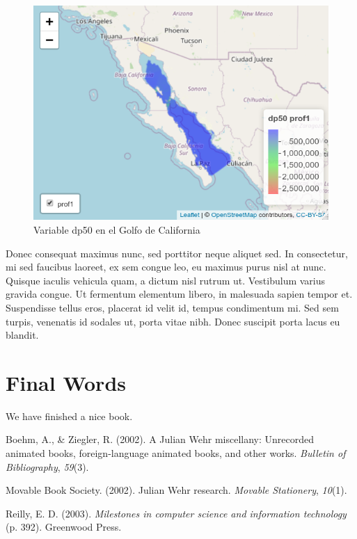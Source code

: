 \documentclass[
]{article}
\newlength{\cslhangindent}
\newenvironment{cslreferences}%
  {\setlength{\parindent}{0pt}%
  \everypar{\setlength{\hangindent}{\cslhangindent}}\ignorespaces}%
  {\par}
\begin{document}
\begin{figure}
\includegraphics[width=0.95\linewidth]{images/golfocalif02} \caption{Variable dp50 en el Golfo de California}\label{fig:Mapa06}
\end{figure}

Donec consequat maximus nunc, sed porttitor neque aliquet sed. In consectetur, mi sed faucibus laoreet, ex sem congue leo, eu maximus purus nisl at nunc. Quisque iaculis vehicula quam, a dictum nisl rutrum ut. Vestibulum varius gravida congue. Ut fermentum elementum libero, in malesuada sapien tempor et. Suspendisse tellus eros, placerat id velit id, tempus condimentum mi. Sed sem turpis, venenatis id sodales ut, porta vitae nibh. Donec suscipit porta lacus eu blandit.

\hypertarget{final-words}{%
\section{Final Words}\label{final-words}}

We have finished a nice book.

\hypertarget{refs}{}
\begin{cslreferences}
\leavevmode\hypertarget{ref-Bohem2002}{}%
Boehm, A., \& Ziegler, R. (2002). A Julian Wehr miscellany: Unrecorded animated books, foreign-language animated books, and other works. \emph{Bulletin of Bibliography}, \emph{59}(3).

\leavevmode\hypertarget{ref-MBS2002}{}%
Movable Book Society. (2002). Julian Wehr research. \emph{Movable Stationery}, \emph{10}(1).

\leavevmode\hypertarget{ref-Reilly2003}{}%
Reilly, E. D. (2003). \emph{Milestones in computer science and information technology} (p. 392). Greenwood Press.
\end{cslreferences}
\end{document}
